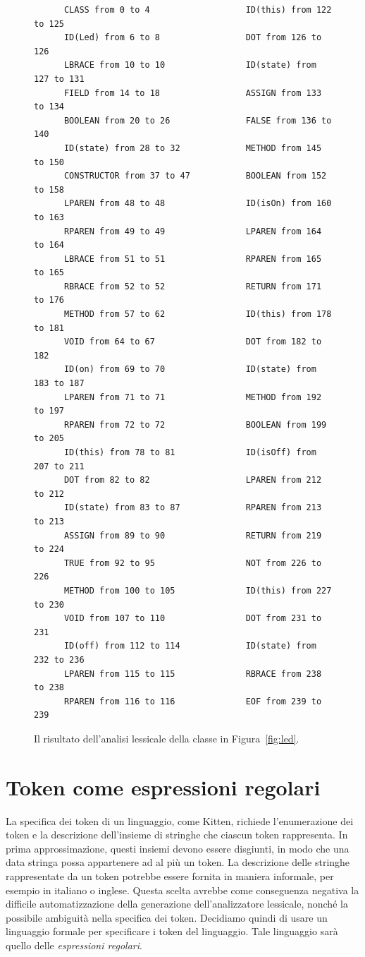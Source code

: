 \begin{figure}[t]
\begin{verbatim}
      CLASS from 0 to 4                   ID(this) from 122 to 125
      ID(Led) from 6 to 8                 DOT from 126 to 126
      LBRACE from 10 to 10                ID(state) from 127 to 131
      FIELD from 14 to 18                 ASSIGN from 133 to 134
      BOOLEAN from 20 to 26               FALSE from 136 to 140
      ID(state) from 28 to 32             METHOD from 145 to 150
      CONSTRUCTOR from 37 to 47           BOOLEAN from 152 to 158
      LPAREN from 48 to 48                ID(isOn) from 160 to 163
      RPAREN from 49 to 49                LPAREN from 164 to 164
      LBRACE from 51 to 51                RPAREN from 165 to 165
      RBRACE from 52 to 52                RETURN from 171 to 176
      METHOD from 57 to 62                ID(this) from 178 to 181
      VOID from 64 to 67                  DOT from 182 to 182
      ID(on) from 69 to 70                ID(state) from 183 to 187
      LPAREN from 71 to 71                METHOD from 192 to 197
      RPAREN from 72 to 72                BOOLEAN from 199 to 205
      ID(this) from 78 to 81              ID(isOff) from 207 to 211
      DOT from 82 to 82                   LPAREN from 212 to 212
      ID(state) from 83 to 87             RPAREN from 213 to 213
      ASSIGN from 89 to 90                RETURN from 219 to 224
      TRUE from 92 to 95                  NOT from 226 to 226
      METHOD from 100 to 105              ID(this) from 227 to 230
      VOID from 107 to 110                DOT from 231 to 231
      ID(off) from 112 to 114             ID(state) from 232 to 236
      LPAREN from 115 to 115              RBRACE from 238 to 238
      RPAREN from 116 to 116              EOF from 239 to 239
\end{verbatim}
\caption{Il risultato dell'analisi lessicale della classe in Figura~\ref{fig:led}.}\label{fig:led_lexical}
\end{figure}
%
\section{Token come espressioni regolari}\label{sec:regular_expressions}
%
La specifica dei token di un linguaggio, come Kitten, richiede l'enumerazione
dei token e la descrizione dell'insieme di stringhe che ciascun token
rappresenta. In prima approssimazione,
questi insiemi devono essere disgiunti, in modo che una data
stringa possa appartenere ad al pi\`u un token. La descrizione delle stringhe
rappresentate da un token potrebbe essere fornita in maniera informale, per
esempio in italiano o inglese. Questa scelta avrebbe come conseguenza
negativa la difficile automatizzazione della generazione dell'analizzatore
lessicale, nonch\'e la possibile ambiguit\`a nella specifica dei token.
Decidiamo quindi di usare un linguaggio formale per specificare i token
del linguaggio. Tale linguaggio sar\`a quello delle
\emph{espressioni regolari}.

